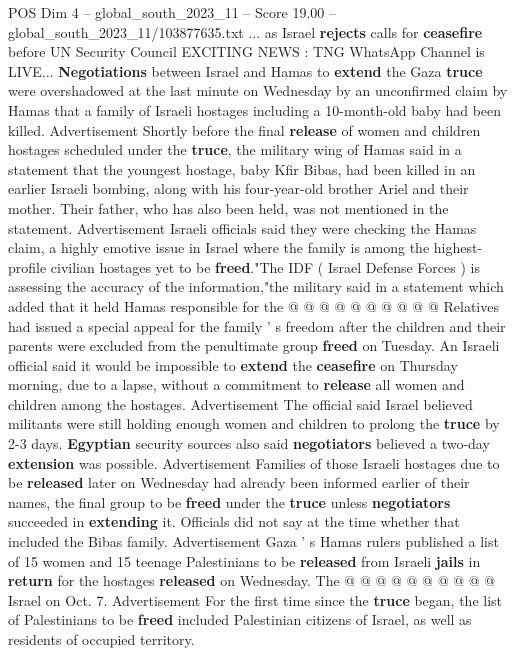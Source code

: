 \begin{textsample}{POS Dim 4 – global\_south\_2023\_11 – Score 19.00 – global\_south\_2023\_11/103877635.txt}  \label{ex:f4_pos_167}
... as Israel \textbf{rejects} calls for \textbf{ceasefire} before UN Security Council EXCITING NEWS : TNG WhatsApp Channel is LIVE... \textbf{Negotiations} between Israel and Hamas to \textbf{extend} the Gaza \textbf{truce} were overshadowed at the last minute on Wednesday by an unconfirmed claim by Hamas that a family of Israeli hostages including a 10-month-old baby had been killed.
Advertisement Shortly before the final \textbf{release} of women and children hostages scheduled under the \textbf{truce}, the military wing of Hamas said in a statement that the youngest hostage, baby Kfir Bibas, had been killed in an earlier Israeli bombing, along with his four-year-old brother Ariel and their mother.
Their father, who has also been held, was not mentioned in the statement.
Advertisement Israeli officials said they were checking the Hamas claim, a highly emotive issue in Israel where the family is among the highest-profile civilian hostages yet to be \textbf{freed}."The IDF ( Israel Defense Forces ) is assessing the accuracy of the information,"the military said in a statement which added that it held Hamas responsible for the @ @ @ @ @ @ @ @ @ @ Relatives had issued a special appeal for the family ' s freedom after the children and their parents were excluded from the penultimate group \textbf{freed} on Tuesday.
An Israeli official said it would be impossible to \textbf{extend} the \textbf{ceasefire} on Thursday morning, due to a lapse, without a commitment to \textbf{release} all women and children among the hostages.
Advertisement The official said Israel believed militants were still holding enough women and children to prolong the \textbf{truce} by 2-3 days. \textbf{Egyptian} security sources also said \textbf{negotiators} believed a two-day \textbf{extension} was possible.
Advertisement Families of those Israeli hostages due to be \textbf{released} later on Wednesday had already been informed earlier of their names, the final group to be \textbf{freed} under the \textbf{truce} unless \textbf{negotiators} succeeded in \textbf{extending} it.
Officials did not say at the time whether that included the Bibas family.
Advertisement Gaza ' s Hamas rulers published a list of 15 women and 15 teenage Palestinians to be \textbf{released} from Israeli \textbf{jails} in \textbf{return} for the hostages \textbf{released} on Wednesday.
The @ @ @ @ @ @ @ @ @ @ Israel on Oct. 7.
Advertisement For the first time since the \textbf{truce} began, the list of Palestinians to be \textbf{freed} included Palestinian citizens of Israel, as well as residents of occupied territory.

\end{textsample}
